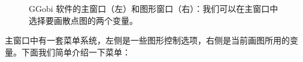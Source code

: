\documentclass[
  b5paper,
  UTF8,twoside]{book}
\begin{document}
\begin{figure}

{\centering {}

}

\caption[GGobi 软件的主窗口和图形窗口 ]{GGobi 软件的主窗口（左）和图形窗口（右）：我们可以在主窗口中选择要画散点图的两个变量。}\label{fig:GGobi-main-window}
\end{figure}



主窗口中有一套菜单系统，左侧是一些图形控制选项，右侧是当前画图所用的变量。下面我们简单介绍一下菜单：
\end{document}
